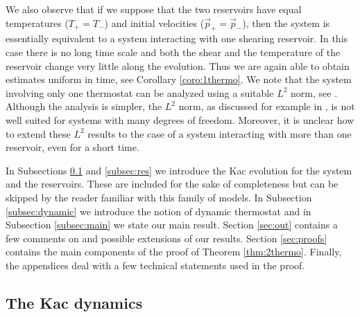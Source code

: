 \documentclass{article}
\begin{document}
We also observe that if we suppose that the two reservoirs have equal temperatures  ($T_+=T_-$) and initial velocities
($\vec p_+=\vec p_-$), then the system is essentially equivalent to a system interacting with one shearing reservoir. In
this case there is no long time scale and both the shear and the temperature of the reservoir change very little along
the evolution. Thus we are again able to obtain estimates uniform in time, see Corollary \ref{coro:1thermo}. We note
that the system involving only one thermostat can be analyzed using a suitable $L^2$ norm, see \cite{BLV,BPP}. Although
the analysis is simpler, the $L^2$ norm, as discussed for example in \cite{BLV}, is not well suited for systems with
many degrees of freedom. Moreover, it is unclear how to extend these $L^2$ results to the case of a system interacting
with more than one reservoir, even for a short time.

In Subsections \ref{subsec:Kac} and \ref{subsec:res} we introduce the Kac evolution for the system and the reservoirs. 
These are included for the sake of completeness but can be skipped by the reader familiar with this family of models. 
In Subsection \ref{subsec:dynamic} we introduce the notion of dynamic thermostat and in Subsection \ref{subsec:main} we 
state our main result. Section \ref{sec:out} contains a few comments on and possible extensions of our results.
Section \ref{sec:proofs} contains the main components of the proof of Theorem \ref{thm:2thermo}. Finally, the appendices
deal with a few technical statements used in the proof.


\subsection{The Kac dynamics} \label{subsec:Kac}
\end{document}
